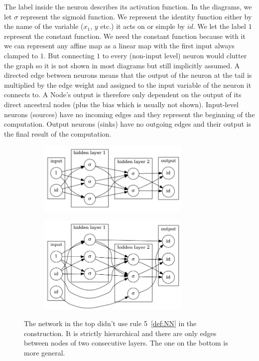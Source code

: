 \documentclass[11pt, a4paper]{report}
\theoremstyle{plain}
\theoremstyle{definition}
\theoremstyle{remark}
\begin{document}
The label inside the neuron describes its activation function. In the diagrams,
we let $\sigma$ represent the sigmoid function. We represent the identity
function either by the name of the variable ($x_1$, $y$ etc.) it acts on or
simple by $id$.   We let the label $1$ represent the constant function. We need
the constant function because with it we can represent any affine map as a
linear map with the first input always clamped to $1$. But connecting $1$ to
every (non-input level) neuron would clutter the graph so it is not shown in
most diagrams but still implicitly assumed. A directed edge between neurons
means that the output of the neuron at the tail is multiplied by the edge weight
and assigned to the input variable of the neuron it connects to. A Node's output
is therefore only dependent on the output of its direct ancestral nodes (plus
the bias which is usually not shown). Input-level neurons (sources) have no
incoming edges and they represent the beginning of the computation. Output
neurons (sinks) have no outgoing edges and their output is the final result of
the computation.

\begin{figure}[h]
\centering
\begin{subfigure}[b]{0.5\textwidth}
\includegraphics[width=0.8\textwidth]{./plots/neuronlayers.gv.png}
\end{subfigure}
\begin{subfigure}[b]{0.5\textwidth}
\includegraphics[width=0.8\textwidth]{./plots/neuronlayers.2.gv.png}
\end{subfigure}
\caption{The network in the top didn't use rule 5~\ref{def:NN} in the construction.
It is strictly hierarchical and there are only edges between nodes of two
consecutive layers. The one on the bottom is more general.
}
\label{fig:nn1}
\end{figure}
\end{document}

